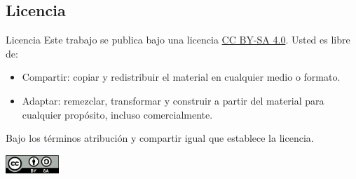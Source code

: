 \documentclass[8pt, t]{beamer}
\begin{document}
\subsection{Licencia}
\label{sec:org02abd1e}

\begin{frame}[label={sec:org159ff5d}]{Licencia}
Este trabajo se publica bajo una licencia \href{https://creativecommons.org/licenses/by-sa/4.0/}{CC BY-SA 4.0}. Usted es libre de:

\begin{itemize}
\item \alert{Compartir}: copiar y redistribuir el material en cualquier medio o formato.
\item \alert{Adaptar}: remezclar, transformar y construir a partir del material para cualquier propósito, incluso comercialmente.
\end{itemize}

Bajo los términos \alert{atribución} y \alert{compartir igual} que establece la licencia.

\begin{center}
\includegraphics[width=2cm]{core/by-sa.png}
\end{center}
\end{frame}
\end{document}
